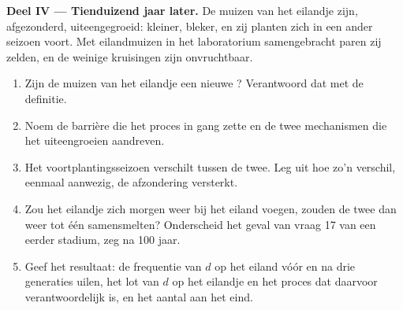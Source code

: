 \begin{problem}
\medskip
\noindent\textbf{Deel IV --- Tienduizend jaar later.}
De muizen van het eilandje zijn, afgezonderd, uiteengegroeid: kleiner,
bleker, en zij planten zich in een ander seizoen voort. Met eilandmuizen
in het laboratorium samengebracht paren zij zelden, en de weinige
kruisingen zijn onvruchtbaar.
\begin{enumerate}[resume]
  \item Zijn de muizen van het eilandje een nieuwe ? Verantwoord dat
        met de definitie.
  \item Noem de barrière die het proces in gang zette en de twee
        mechanismen die het uiteengroeien aandreven.
  \item Het voortplantingsseizoen verschilt tussen de twee. Leg uit hoe
        zo'n verschil, eenmaal aanwezig, de afzondering versterkt.
  \item Zou het eilandje zich morgen weer bij het eiland voegen, zouden
        de twee dan weer tot één  samensmelten? Onderscheid het
        geval van vraag 17 van een eerder stadium, zeg na 100 jaar.
  \item Geef het resultaat: de frequentie van $d$ op het eiland vóór en
        na drie generaties uilen, het lot van $d$ op het eilandje en het
        proces dat daarvoor verantwoordelijk is, en het aantal  aan
        het eind.
\end{enumerate}
\end{problem}
